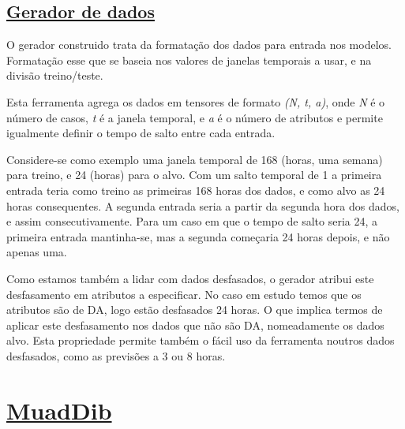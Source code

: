 \subsection{\href{https://github.com/alquimodelia/alquitable/blob/main/alquitable/generator.py}{Gerador de dados}}

O gerador construido trata da formatação dos dados para entrada nos modelos. Formatação esse que se baseia nos valores de janelas temporais a usar, e na divisão treino/teste.\par
Esta ferramenta agrega os dados em tensores de formato \textit{(N, t, a)}, onde \textit{N} é o número de casos, \textit{t} é a janela temporal, e \textit{a} é o número de atributos e permite igualmente definir o tempo de salto entre cada entrada.\par
Considere-se como exemplo uma janela temporal de 168 (horas, uma semana) para treino, e 24 (horas) para o alvo. Com um salto temporal de 1 a primeira entrada teria como treino as primeiras 168 horas dos dados, e como alvo as 24 horas consequentes. A segunda entrada seria a partir da segunda hora dos dados, e assim consecutivamente. Para um caso em que o tempo de salto seria 24, a primeira entrada mantinha-se, mas a segunda começaria 24 horas depois, e não apenas uma.\par

Como estamos também a lidar com dados desfasados, o gerador atribui este desfasamento em atributos a especificar. No caso em estudo temos que os atributos são de \gls{DA}, logo estão desfasados 24 horas. O que implica termos de aplicar este desfasamento nos dados que não são \gls{DA}, nomeadamente os dados alvo. Esta propriedade permite também o fácil uso da ferramenta noutros dados desfasados, como as previsões a 3 ou 8 horas.\par

\section{\href{https://github.com/alquimodelia/MuadDib}{MuadDib}\label{se:muaddib}}


